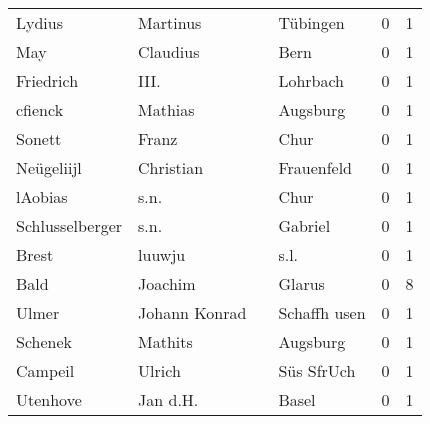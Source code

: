 \begin{tabular}{llllrr}
                   Lydius &                           Martinus &             &                                    Tübingen &          0 &         1 \\
                      May &                           Claudius &             &                                        Bern &          0 &         1 \\
                Friedrich &                               III. &             &                                    Lohrbach &          0 &         1 \\
                  cfienck &                            Mathias &             &                                    Augsburg &          0 &         1 \\
                   Sonett &                              Franz &             &                                        Chur &          0 &         1 \\
               Neügeliijl &                          Christian &             &                                  Frauenfeld &          0 &         1 \\
                  lAobias &                               s.n. &             &                                        Chur &          0 &         1 \\
          Schlusselberger &                               s.n. &             &                                     Gabriel &          0 &         1 \\
                    Brest &                             luuwju &             &                                        s.l. &          0 &         1 \\
                     Bald &                            Joachim &             &                                      Glarus &          0 &         8 \\
                    Ulmer &                      Johann Konrad &             &                                Schaffh usen &          0 &         1 \\
                  Schenek &                            Mathits &             &                                    Augsburg &          0 &         1 \\
                  Campeil &                             Ulrich &             &                                  Süs SfrUch &          0 &         1 \\
                 Utenhove &                           Jan d.H. &             &                                       Basel &          0 &         1 \\

\end{tabular}
